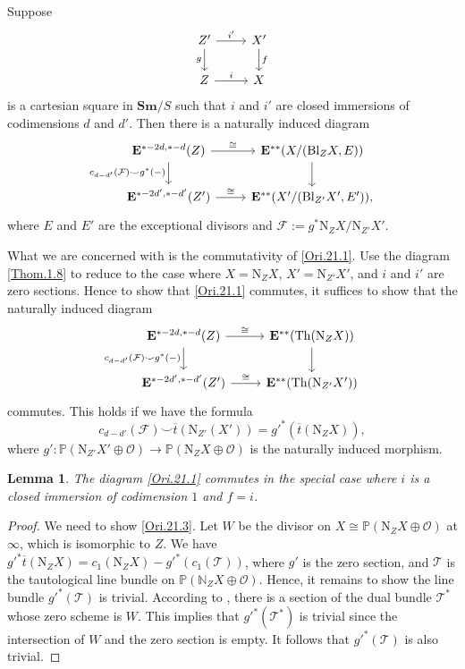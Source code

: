 \documentclass[11pt, a4paper]{amsart}
\newtheorem{lem}[thm]{Lemma}
\theoremstyle{definition}
\numberwithin{equation}{subsection}
\newcommand{\N}{\mathbb{N}}
\renewcommand{\P}{\mathbb{P}}
\newcommand{\Sm}{\mathbf{Sm}}
\newcommand{\Blow}{{\mathrm{Bl}}}
\newcommand{\Normal}{{\mathrm{N}}}
\newcommand{\Thom}{\mathrm{Th}}
\newcommand{\ol}{\overline}
\newcommand{\cF}{\mathcal{F}}
\newcommand{\cO}{\mathcal{O}}
\newcommand{\cT}{\mathcal{T}}
\newcommand{\ringE}{\mathbf{E}}
\begin{document}
Suppose
\begin{equation}
\label{Ori.21.2}
\begin{tikzcd}
Z'\ar[r,"i'"]\ar[d,"g"']&
X'\ar[d,"f"]
\\
Z\ar[r,"i"]&
X
\end{tikzcd}
\end{equation}
is a cartesian square in $\Sm/S$ such that $i$ and $i'$ are closed immersions of codimensions $d$ and $d'$.
Then there is a naturally induced diagram
\begin{equation}
\label{Ori.21.1}
\begin{tikzcd}
\ringE^{*-2d,*-d}(Z)\ar[d,"c_{d-d'}(\cF) \smile g^*(-)"']\ar[r,"\cong"]&
\ringE^{**}(X/(\Blow_Z X,E))\ar[d]
\\
\ringE^{*-2d',*-d'}(Z')\ar[r,"\cong"]&
\ringE^{**}(X'/(\Blow_{Z'}X',E')),
\end{tikzcd}
\end{equation}
where $E$ and $E'$ are the exceptional divisors and $\cF:=g^*\Normal_Z X / \Normal_{Z'}X'$.

What we are concerned with is the commutativity of \eqref{Ori.21.1}.
Use the diagram \eqref{Thom.1.8} to reduce to the case where $X=\Normal_Z X$, $X'=\Normal_{Z'} X'$, and $i$ and $i'$ are zero sections.
Hence to show that \eqref{Ori.21.1} commutes, it suffices to show that the naturally induced diagram
\begin{equation}
\label{Ori.21.4}
\begin{tikzcd}
\ringE^{*-2d,*-d}(Z)\ar[d,"c_{d-d'}(\cF)\smile g^*(-)"']\ar[r,"\cong"]&
\ringE^{**}(\Thom(\Normal_Z X))\ar[d]
\\
\ringE^{*-2d',*-d'}(Z')\ar[r,"\cong"]&
\ringE^{**}(\Thom(\Normal_{Z'}X'))
\end{tikzcd}
\end{equation}
commutes.
This holds if we have the formula
\begin{equation}
\label{Ori.21.3}
c_{d-d'}(\cF)\smile \ol{t}(\Normal_{Z'}(X'))
=
g'^*(\ol{t}(\Normal_Z X)),
\end{equation}
where $g'\colon \P(\Normal_{Z'} X'\oplus \cO)\to \P(\Normal_Z X\oplus \cO)$ is the naturally induced morphism.


\begin{lem}
\label{Ori.22}
The diagram \eqref{Ori.21.1} commutes in the special case where $i$ is a closed immersion of codimension $1$ and $f=i$.
\end{lem}
\begin{proof}
We need to show \eqref{Ori.21.3}.
Let $W$ be the divisor on $X\cong \P(\Normal_Z X\oplus \cO)$ at $\infty$, 
which is isomorphic to $Z$.
We have $g'^* \ol{t}(\Normal_Z X) = c_1(\Normal_Z X)-g'^*(c_1(\cT))$, where $g'$ is the zero section, and $\cT$ is the tautological line bundle on $\P(\N_Z X\oplus \cO)$.
Hence, it remains to show the line bundle $g'^*(\cT)$ is trivial.
According to \cite[Paragraph B.5.6]{Fulton}, there is a section of the dual bundle $\cT^*$ whose zero scheme is $W$.
This implies that $g'^*(\cT^*)$ is trivial since the intersection of $W$ and the zero section is empty.
It follows that $g'^*(\cT)$ is also trivial.
\end{proof}
\end{document}
